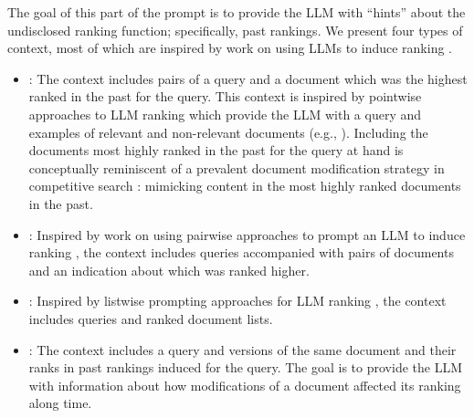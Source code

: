  The goal of this part of the
prompt is to provide the LLM with ``hints'' about the undisclosed
ranking function; specifically, past rankings. We present four
types of context, most of which are inspired by work on using LLMs to
induce ranking \cite{nogueira2020document, qin2023large, ma2023zero}.
\begin{itemize}
\item {}: The context includes pairs of a query and a
  document which was the highest ranked in the past for the
  query. This context is inspired by pointwise approaches to LLM ranking which provide the LLM with a query and examples of relevant and non-relevant documents (e.g., \cite{Liang+al:22a}). Including the documents most highly ranked in the past for the query at hand is conceptually reminiscent of a prevalent document modification strategy in competitive search \cite{raifer2017information,goren_driving_2021}: mimicking content in the most highly ranked documents in the past.
\item {}: Inspired by work on using pairwise approaches to prompt an LLM to induce ranking \cite{qin2023large}, the context
  includes queries accompanied with pairs of documents and an indication about which was ranked higher. 
\item {}: Inspired by listwise prompting
  approaches for LLM ranking \cite{ma2023zero}, the context includes queries and ranked document lists. 
\item {}: The context includes a query and
  versions of the same document and their ranks in past rankings induced for the query. The goal is to provide the LLM with information about how modifications of a document affected its ranking along time.
  \end{itemize}





